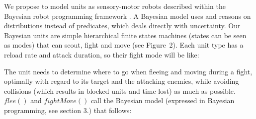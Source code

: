 We propose to model units as sensory-motor robots described within the Bayesian robot programming framework \citep{Lebeltel04}. A Bayesian model uses and reasons on distributions instead of predicates, which deals directly with uncertainty. %
Our Bayesian units are simple hierarchical finite states machines (states can be seen as modes) that can scout, fight and move (see Figure~2). Each unit type has a reload rate and attack duration, so their fight mode will be like:
\begin{algorithmic}
\Else
\EndIf
\end{algorithmic}
The unit needs to determine where to go when fleeing and moving during a fight, optimally with regard to its target and the attacking enemies, while avoiding collisions (which results in blocked units and time lost) as much as possible. $flee()$ and $fightMove()$ call the Bayesian model (expressed in Bayesian programming, see section 3.) that follows:
